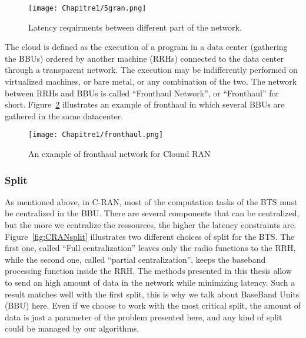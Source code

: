  \begin{figure}[h]
      \begin{center}
      \texttt{[image: Chapitre1/5gran.png]}
      \end{center}
      \caption{Latency requirments between different part of the network.}\label{fig:5gran}
      \end{figure}

The cloud is defined as the execution of a program in a data center (gathering the BBUs) ordered by another machine (RRHs) connected to the data center through a transparent network.
 The execution may be indifferently performed on virtualized machines, or bare metal, or any combination of the two. The network between RRHs and BBUs is called “Fronthaul Network”, or “Fronthaul” for short. Figure~\ref{fig:fronthaul} illustrates an example of fronthaul in which several BBUs are gathered in the same datacenter. 

  \begin{figure}[h]
      \begin{center}
      \texttt{[image: Chapitre1/fronthaul.png]}
      \end{center}
      \caption{An example of fronthaul network for Clound RAN}\label{fig:fronthaul}
      \end{figure}
      
      \subsubsection{Split}

      As mentioned above, in C-RAN, most of the computation tasks of the BTS must be centralized in the BBU. There are several components that can be centralized, but the more we centralize the ressources, the higher the latency constraints are.
      Figure~\ref{fig:CRANsplit} illustrates two different choices of split for the BTS. The first one, called ``Full centralization'' leaves only the radio functions to the RRH, while the second one, called ``partial centralization'', keeps the baseband processing function inside the RRH. The methods presented in this thesis allow to send an high amount of data in the network while minimizing latency. Such a result matches well with the first split, this is why we talk about BaseBand Units (BBU) here. Even if we choose to work with the most critical split, the amount of data is just a parameter of the problem presented here, and any kind of split could be managed by our algorithms.
      

